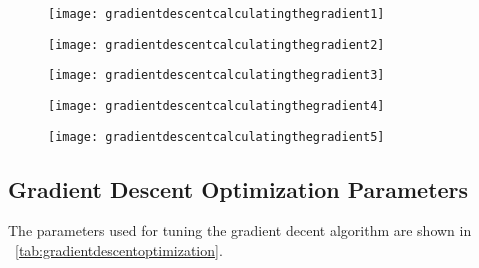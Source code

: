  	\begin{figure}[h]
		\centering
		\texttt{[image: gradientdescentcalculatingthegradient1]}
		\caption{}
		\label{fig:gradientdescentcalculatingthegradient1}
	\end{figure}

 	\begin{figure}[h]
		\centering
		\texttt{[image: gradientdescentcalculatingthegradient2]}
		\caption{}
		\label{fig:gradientdescentcalculatingthegradient2}
	\end{figure}

 	\begin{figure}[h]
		\centering
		\texttt{[image: gradientdescentcalculatingthegradient3]}
		\caption{}
		\label{fig:gradientdescentcalculatingthegradient3}
	\end{figure}

 	\begin{figure}[h]
		\centering
		\texttt{[image: gradientdescentcalculatingthegradient4]}
		\caption{}
		\label{fig:gradientdescentcalculatingthegradient4}
	\end{figure}

 	\begin{figure}[h]
		\centering
		\texttt{[image: gradientdescentcalculatingthegradient5]}
		\caption{}
		\label{fig:gradientdescentcalculatingthegradient5}
	\end{figure}

	\subsection{Gradient Descent Optimization Parameters}
The parameters used for tuning the gradient decent algorithm are shown in \tablename~\ref{tab:gradientdescentoptimization}.


